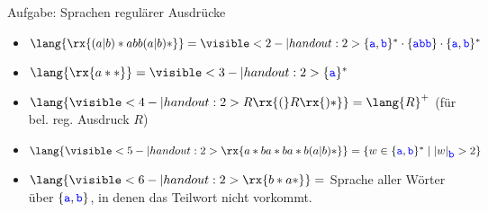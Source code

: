 \begin{frame}{Aufgabe: Sprachen regulärer Ausdrücke}
	\begin{itemize}
		\item $\lang{\rx{(a|b)*abb(a|b)*}} = \visible<2-|handout:2>{\{\word a, \word b\}^* \cdot \{\word a\word b\word b\} \cdot \{\word a, \word b\}^*}$
		\item $\lang{\rx{a**}} = \visible<3-|handout:2>{\{\word a\}^*}$
		\item $\lang{\visible<4-|handout:2>{R\rx{(}R\rx{)*}}} = \lang{R}^+$ \quad (für bel. reg. Ausdruck $R$)
		\item $\lang{\visible<5-|handout:2>{\rx{a*ba*ba*b(a|b)*}}} = \set{ w \in \{\word a, \word b\}^* \Mid \size{w}_{\word b} > 2 } $
		\item $\lang{\visible<6-|handout:2>{\rx{b*a*}}} =$ Sprache aller Wörter über $\left\{\hbox{\textcolor{blue}{\texttt{a}}}, \hbox{\textcolor{blue}{\texttt{b}}}\right\}$, in denen das Teilwort  nicht vorkommt.
	\end{itemize}
\end{frame}
